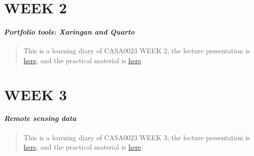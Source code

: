 \documentclass[
  letterpaper,
  DIV=11,
  numbers=noendperiod]{scrreprt}
\begin{document}

\hypertarget{week-2}{%
\chapter*{\texorpdfstring{\textbf{WEEK 2}}{WEEK 2}}\label{week-2}}

\hypertarget{portfolio-tools-xaringan-and-quarto}{%
\subsubsection*{\texorpdfstring{\textbf{\emph{Portfolio tools: Xaringan
and
Quarto}}}{Portfolio tools: Xaringan and Quarto}}\label{portfolio-tools-xaringan-and-quarto}}

\begin{quote}
This is a learning diary of CASA0023 WEEK 2, the lecture presentation is
\href{https://andrewmaclachlan.github.io/CASA0023-lecture-2/\#1}{here},
and the practical material is
\href{https://andrewmaclachlan.github.io/CASA0023/2_portfolio.html}{here}.
\end{quote}


\hypertarget{week-3}{%
\chapter*{\texorpdfstring{\textbf{WEEK 3}}{WEEK 3}}\label{week-3}}

\hypertarget{remote-sensing-data-1}{%
\subsubsection*{\texorpdfstring{\textbf{\emph{Remote sensing
data}}}{Remote sensing data}}\label{remote-sensing-data-1}}

\begin{quote}
This is a learning diary of CASA0023 WEEK 3, the lecture presentation is
\href{https://andrewmaclachlan.github.io/CASA0023-lecture-3/\#1}{here},
and the practical material is
\href{https://andrewmaclachlan.github.io/CASA0023/3_corrections.html}{here}.
\end{quote}

\end{document}
